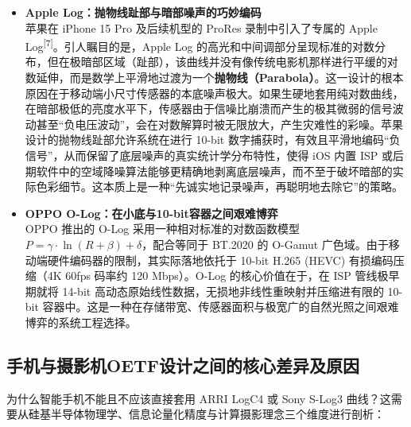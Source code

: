 \documentclass[12pt, a4paper]{ctexart}
\newcommand{\scite}[1]{\textsuperscript{[#1]}}
\begin{document}
\begin{itemize}
    \item \textbf{Apple Log：抛物线趾部与暗部噪声的巧妙编码} \\
    苹果在 iPhone 15 Pro 及后续机型的 ProRes 录制中引入了专属的 Apple Log\scite{7}。引人瞩目的是，Apple Log 的高光和中间调部分呈现标准的对数分布，但在极暗部区域（趾部），该曲线并没有像传统电影机那样进行平缓的对数延伸，而是数学上平滑地过渡为一个\textbf{抛物线（Parabola）}。这一设计的根本原因在于移动端小尺寸传感器的本底噪声极大。如果生硬地套用纯对数曲线，在暗部极低的亮度水平下，传感器由于信噪比崩溃而产生的极其微弱的信号波动甚至“负电压波动”，会在对数解算时被无限放大，产生灾难性的彩噪。苹果设计的抛物线趾部允许系统在进行 10-bit 数字捕获时，有效且平滑地编码“负信号”，从而保留了底层噪声的真实统计学分布特性，使得 iOS 内置 ISP 或后期软件中的空域降噪算法能够更精确地剥离底层噪声，而不至于破坏暗部的实际色彩细节。这本质上是一种“先诚实地记录噪声，再聪明地去除它”的策略。
    \item \textbf{OPPO O-Log：在小底与10-bit容器之间艰难博弈} \\
    OPPO 推出的 O-Log 采用一种相对标准的对数函数模型 $P = \gamma \cdot \ln(R+\beta) + \delta$，配合等同于 BT.2020 的 O-Gamut 广色域。由于移动端硬件编码器的限制，其实际落地依托于 10-bit H.265 (HEVC) 有损编码压缩（4K 60fps 码率约 120 Mbps）。O-Log 的核心价值在于，在 ISP 管线极早期就将 14-bit 高动态原始线性数据，无损地非线性重映射并压缩进有限的 10-bit 容器中。这是一种在存储带宽、传感器面积与极宽广的自然光照之间艰难博弈的系统工程选择。
\end{itemize}

\subsection{手机与摄影机OETF设计之间的核心差异及原因}

为什么智能手机不能且不应该直接套用 ARRI LogC4 或 Sony S-Log3 曲线？这需要从硅基半导体物理学、信息论量化精度与计算摄影理念三个维度进行剖析：
\end{document}

